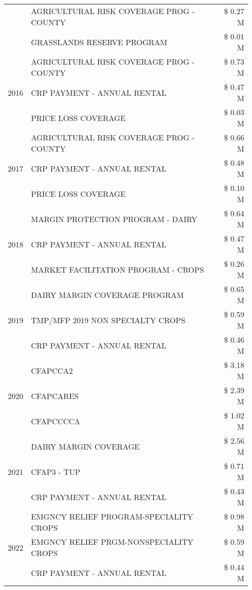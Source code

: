\begin{tabular}{llr}
 & AGRICULTURAL RISK COVERAGE PROG - COUNTY & \$ 0.27 M \\
 & GRASSLANDS RESERVE PROGRAM & \$ 0.01 M \\
\cline{1-3}
\multirow[t]{3}{*}{2016} & AGRICULTURAL RISK COVERAGE PROG - COUNTY & \$ 0.73 M \\
 & CRP PAYMENT - ANNUAL RENTAL & \$ 0.47 M \\
 & PRICE LOSS COVERAGE & \$ 0.03 M \\
\cline{1-3}
\multirow[t]{3}{*}{2017} & AGRICULTURAL RISK COVERAGE PROG - COUNTY & \$ 0.66 M \\
 & CRP PAYMENT - ANNUAL RENTAL & \$ 0.48 M \\
 & PRICE LOSS COVERAGE & \$ 0.10 M \\
\cline{1-3}
\multirow[t]{3}{*}{2018} & MARGIN PROTECTION PROGRAM - DAIRY & \$ 0.64 M \\
 & CRP PAYMENT - ANNUAL RENTAL & \$ 0.47 M \\
 & MARKET FACILITATION PROGRAM - CROPS & \$ 0.26 M \\
\cline{1-3}
\multirow[t]{3}{*}{2019} & DAIRY MARGIN COVERAGE PROGRAM & \$ 0.65 M \\
 & TMP/MFP 2019 NON SPECIALTY CROPS & \$ 0.59 M \\
 & CRP PAYMENT - ANNUAL RENTAL & \$ 0.46 M \\
\cline{1-3}
\multirow[t]{3}{*}{2020} & CFAPCCA2 & \$ 3.18 M \\
 & CFAPCARES & \$ 2.39 M \\
 & CFAPCCCCA & \$ 1.02 M \\
\cline{1-3}
\multirow[t]{3}{*}{2021} & DAIRY MARGIN COVERAGE & \$ 2.56 M \\
 & CFAP3 - TUP & \$ 0.71 M \\
 & CRP PAYMENT - ANNUAL RENTAL & \$ 0.43 M \\
\cline{1-3}
\multirow[t]{3}{*}{2022} & EMGNCY RELIEF PROGRAM-SPECIALITY CROPS & \$ 0.98 M \\
 & EMGNCY RELIEF PRGM-NONSPECIALITY CROPS & \$ 0.59 M \\
 & CRP PAYMENT - ANNUAL RENTAL & \$ 0.44 M \\
\cline{1-3}
\bottomrule
\end{tabular}
